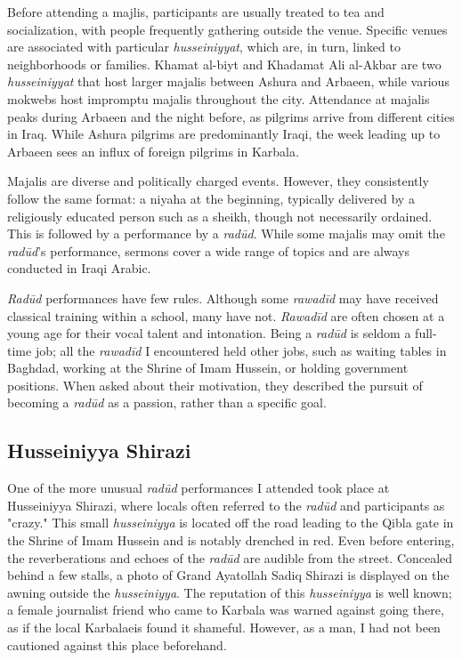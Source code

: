 Before attending a majlis, participants are usually treated to tea and socialization, with people frequently gathering outside the venue. Specific venues are associated with particular \emph{husseiniyyat}, which are, in turn, linked to neighborhoods or families. Khamat al-biyt and Khadamat Ali al-Akbar are two \emph{husseiniyyat} that host larger majalis between Ashura and Arbaeen, while various mokwebs host impromptu majalis throughout the city. Attendance at majalis peaks during Arbaeen and the night before, as pilgrims arrive from different cities in Iraq. While Ashura pilgrims are predominantly Iraqi, the week leading up to Arbaeen sees an influx of foreign pilgrims in Karbala.

Majalis are diverse and politically charged events. However, they consistently follow the same format: a niyaha at the beginning, typically delivered by a religiously educated person such as a sheikh, though not necessarily ordained. This is followed by a performance by a \emph{radūd}. While some majalis may omit the \emph{radūd}'s performance, sermons cover a wide range of topics and are always conducted in Iraqi Arabic.

\emph{Radūd} performances have few rules. Although some \emph{rawadīd} may have received classical training within a school, many have not. \emph{Rawadīd} are often chosen at a young age for their vocal talent and intonation. Being a \emph{radūd} is seldom a full-time job; all the \emph{rawadīd} I encountered held other jobs, such as waiting tables in Baghdad, working at the Shrine of Imam Hussein, or holding government positions. When asked about their motivation, they described the pursuit of becoming a \emph{radūd} as a passion, rather than a specific goal.

\subsection{Husseiniyya Shirazi}
One of the more unusual \emph{radūd} performances I attended took place at Husseiniyya Shirazi, where locals often referred to the \emph{radūd} and participants as "crazy." This small \emph{husseiniyya} is located off the road leading to the Qibla gate in the Shrine of Imam Hussein and is notably drenched in red. Even before entering, the reverberations and echoes of the \emph{radūd} are audible from the street. Concealed behind a few stalls, a photo of Grand Ayatollah Sadiq Shirazi is displayed on the awning outside the \emph{husseiniyya}. The reputation of this \emph{husseiniyya} is well known; a female journalist friend who came to Karbala was warned against going there, as if the local Karbalaeis found it shameful. However, as a man, I had not been cautioned against this place beforehand.


